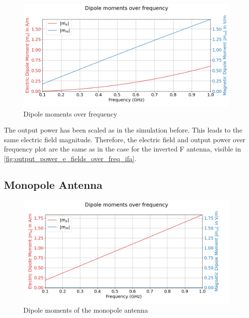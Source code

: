 \begin{figure}[h]
    \centering
    \includegraphics[width=1\linewidth]{content//30_simulations//img/dipole_moment_cfm.png}
    \caption{Dipole moments over frequency}
    \label{fig:dipole_moment_cfm}
\end{figure}



The output power has been scaled as in the simulation before. This leads to the same electric field magnitude. Therefore, the electric field and output power over frequency plot are the same as in the case for the inverted F antenna, visible in \autoref{fig:output_power_e_fields_over_freq_ifa}.

\subsection{Monopole Antenna}

\begin{figure}[h]
    \centering
    \includegraphics[width=1\linewidth]{content//30_simulations//img/dipole_moments_monopole.png}
    \caption{Dipole moments of the monopole antenna}
    \label{fig:dipole_moments_monopole}
\end{figure}

